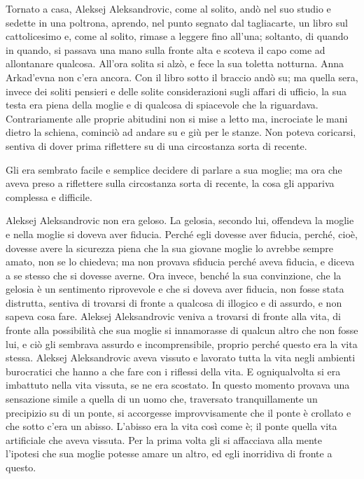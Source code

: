 Tornato a casa, Aleksej Aleksandrovic, come al solito, andò nel suo studio e sedette in una poltrona, aprendo, nel punto segnato dal tagliacarte, un libro sul cattolicesimo e, come al solito, rimase a leggere fino all'una; soltanto, di quando in quando, si passava una mano sulla fronte alta e scoteva il capo come ad allontanare qualcosa. All'ora solita si alzò, e fece la sua toletta notturna. Anna Arkad'evna non c'era ancora. Con il libro sotto il braccio andò su; ma quella sera, invece dei soliti pensieri e delle solite considerazioni sugli affari di ufficio, la sua testa era piena della moglie e di qualcosa di spiacevole che la riguardava. Contrariamente alle proprie abitudini non si mise a letto ma, incrociate le mani dietro la schiena, cominciò ad andare su e giù per le stanze. Non poteva coricarsi, sentiva di dover prima riflettere su di una circostanza sorta di recente. 

Gli era sembrato facile e semplice decidere di parlare a sua moglie; ma ora che aveva preso a riflettere sulla circostanza sorta di recente, la cosa gli appariva complessa e difficile. 

Aleksej Aleksandrovic non era geloso. La gelosia, secondo lui, offendeva la moglie e nella moglie si doveva aver fiducia. Perché egli dovesse aver fiducia, perché, cioè, dovesse avere la sicurezza piena che la sua giovane moglie lo avrebbe sempre amato, non se lo chiedeva; ma non provava sfiducia perché aveva fiducia, e diceva a se stesso che si dovesse averne. Ora invece, benché la sua convinzione, che la gelosia è un sentimento riprovevole e che si doveva aver fiducia, non fosse stata distrutta, sentiva di trovarsi di fronte a qualcosa di illogico e di assurdo, e non sapeva cosa fare. Aleksej Aleksandrovic veniva a trovarsi di fronte alla vita, di fronte alla possibilità che sua moglie si innamorasse di qualcun altro che non fosse lui, e ciò gli sembrava assurdo e incomprensibile, proprio perché questo era la vita stessa. Aleksej Aleksandrovic aveva vissuto e lavorato tutta la vita negli ambienti burocratici che hanno a che fare con i riflessi della vita. E ogniqualvolta si era imbattuto nella vita vissuta, se ne era scostato. In questo momento provava una sensazione simile a quella di un uomo che, traversato tranquillamente un precipizio su di un ponte, si accorgesse improvvisamente che il ponte è crollato e che sotto c'era un abisso. L'abisso era la vita così come è; il ponte quella vita artificiale che aveva vissuta. Per la prima volta gli si affacciava alla mente l'ipotesi che sua moglie potesse amare un altro, ed egli inorridiva di fronte a questo. 

